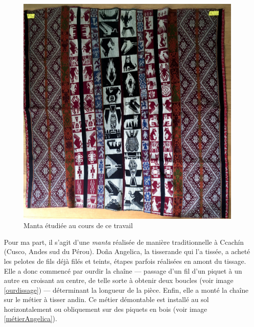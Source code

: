 \documentclass[a4paper, twoside, 12pt]{book}
\begin{document}
\begin{figure}[!h]
    \centering
    \includegraphics[width=15cm]{images/manta.jpg}
    \caption{Manta étudiée au cours de ce travail}
    \label{manta}
\end{figure}


Pour ma part, il s'agit d'une \textit{manta} réalisée de manière \og traditionnelle \fg \:à Ccachín (Cusco, Andes sud du Pérou). Doña Angelica, la tisserande qui l'a tissée, a acheté les pelotes de fils déjà filés et teints, étapes parfois réalisées en amont du tissage. Elle a donc commencé par ourdir la chaîne --- passage d'un fil d'un piquet à un autre en croisant au centre, de telle sorte à obtenir deux boucles (voir image \ref{ourdissage}) --- déterminant la longueur de la pièce. Enfin, elle a monté la chaîne sur le métier à tisser andin. Ce métier démontable est installé au sol horizontalement ou obliquement sur des piquets en bois (voir image \ref{métierAngelica}).
\end{document}
